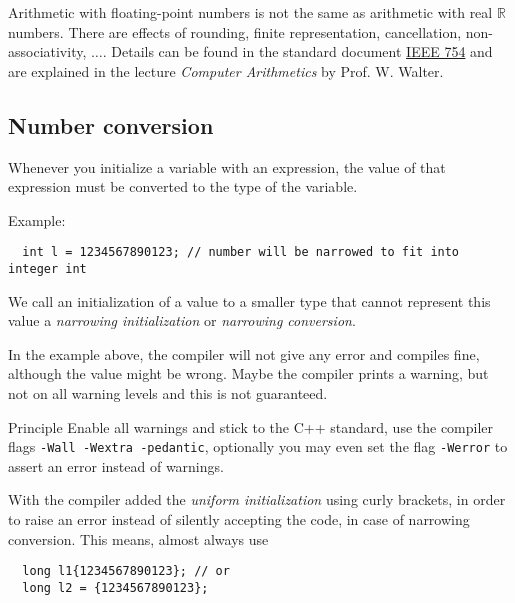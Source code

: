 \begin{rem}
  Arithmetic with floating-point numbers is not the same as arithmetic with real $\mathbb{R}$ numbers. There are effects of rounding, finite representation, cancellation, non-associativity, $\ldots$. Details can be found in the standard document \href{https://standards.ieee.org/content/ieee-standards/en/standard/754-2019.html}{IEEE 754} and are explained in the lecture
  \emph{Computer Arithmetics} by Prof. W. Walter.
\end{rem}



\subsection{Number conversion}
Whenever you initialize a variable with an expression, the value of that expression must be converted to the type of the variable.

Example:
\begin{verbatim}
  int l = 1234567890123; // number will be narrowed to fit into integer int
\end{verbatim}

\begin{defn}
We call an initialization of a value to a smaller type that cannot represent this value a \emph{narrowing initialization} or \emph{narrowing conversion}.
\end{defn}

In the example above, the compiler will not give any error and compiles fine, although the value might be wrong. Maybe the compiler prints a warning, but not on all warning levels and this is not guaranteed.

\begin{guideline}{Principle}
  Enable all warnings and stick to the C++ standard, \ie use the compiler flags \texttt{-Wall -Wextra -pedantic}, optionally you may even set the flag \texttt{-Werror} to assert an error instead of warnings.
\end{guideline}

With\marginpar{[\cxx{11}]}  the compiler added the \emph{uniform initialization} using curly brackets, in order to raise an error instead of silently accepting the code, in case of narrowing conversion. This means, almost always use
\begin{verbatim}
  long l1{1234567890123}; // or
  long l2 = {1234567890123};
\end{verbatim}

